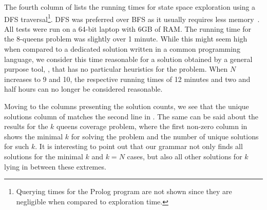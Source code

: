 The fourth column of  lists the running times for state space
exploration using a DFS traversal\footnote{Querying times for the Prolog
program are not shown since they are negligible when compared to exploration
time.}. DFS was preferred over BFS as it usually requires less
memory~\cite{GMRZ10}. All tests were run on a 64-bit laptop with 6GB of RAM. The
running time for the 8-queens problem was slightly over 1 minute. While this
might seem high when compared to a dedicated solution written in a common
programming language, we consider this time reasonable for a solution obtained
by a general purpose tool, \ie, that has no particular heuristics for the
problem. When $N$ increases to 9 and 10, the respective running times of 12
minutes and two and half hours can no longer be considered reasonable.

Moving to the columns presenting the solution counts, we see that the unique
solutions column of  matches the second line in
. The same can be said about the results for the $k$ queens
coverage problem, where the first non-zero column in  shows the
minimal $k$ for solving the problem and the number of unique solutions for such
$k$. It is interesting to point out that our grammar not only finds all
solutions for the minimal $k$ and $k = N$ cases, but also all other solutions
for $k$ lying in between these extremes.
